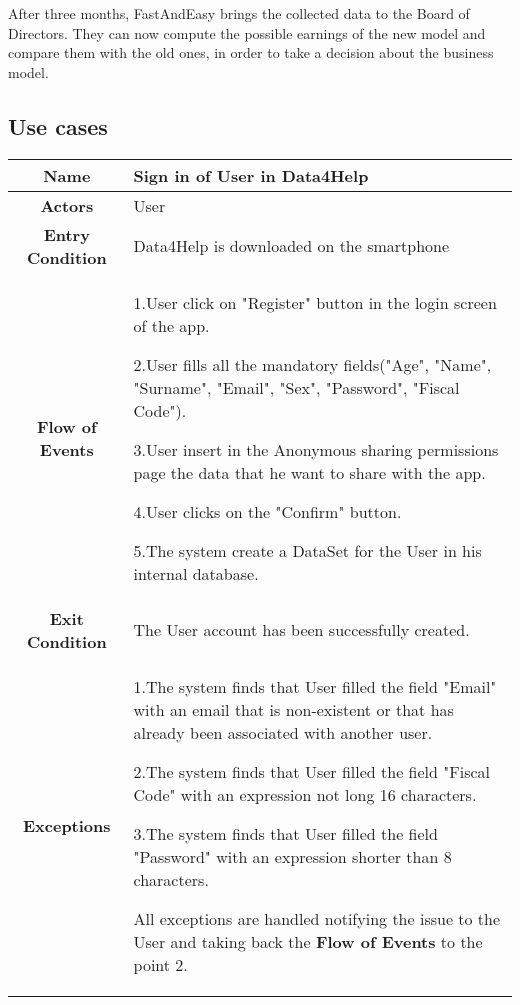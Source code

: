       After three months, FastAndEasy brings the collected data to the Board of Directors. They can now compute the possible earnings of the new model and compare them with the old ones, in order to take a decision about the business model.

  \subsection{Use cases}


        \begin{table}[h!]
        \centering
        \begin{tabularx}{\linewidth}{|c|X|}
          \hline
          \textbf{Name} & Sign in of User in Data4Help\\
        	\hline
        	\textbf{Actors} & User \\
        	\hline
        	\textbf{Entry Condition} & Data4Help is downloaded on the smartphone \\
        	\hline
        	\textbf{Flow of Events} & 1.User click on "Register" button in the login screen of the app.

        					2.User fills all the mandatory fields("Age", "Name", "Surname", "Email", "Sex", "Password", "Fiscal 							Code").

        					3.User insert in the Anonymous sharing permissions page the data that he want to share with 						the app.

        					4.User clicks on the "Confirm" button.

        					5.The system create a DataSet for the User in his internal database.\\
        	\hline
        	\textbf{Exit Condition} & The User account has been successfully created. \\
        	\hline
        	\textbf{Exceptions} &
        					1.The system finds that User filled the field "Email"  with an email that is non-existent or that has 							already been associated with another user.

        					2.The system finds that User filled the field "Fiscal Code" with an expression not long 16 								characters.

        					3.The system finds that User filled the field "Password" with an expression shorter than 8 								characters.

        					All exceptions are handled notifying the issue to the User and taking back the \textbf{Flow of 							Events} to the point 2.\\
       
   \hline

        \end{tabularx}

      \end{table}


